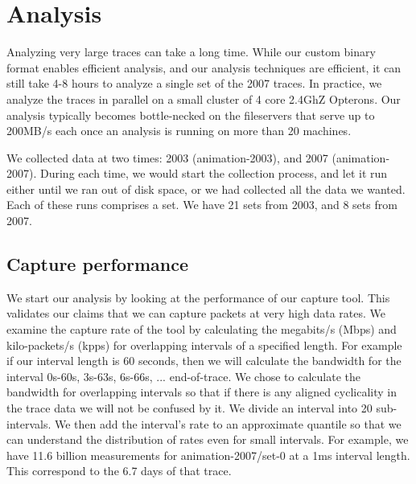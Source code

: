 \section{Analysis}
\label{sec:analysis}

Analyzing very large traces can take a long time.  While our custom
binary format enables efficient analysis, and our analysis techniques
are efficient, it can still take 4-8 hours to analyze a single set of
the 2007 traces.  In practice, we analyze the traces in parallel on a
small cluster of 4 core 2.4GhZ Opterons.  Our analysis typically
becomes bottle-necked on the fileservers that serve up to 200MB/s each
once an analysis is running on more than 20 machines.

We collected data at two times: 2003 (animation-2003), and 2007
(animation-2007).  During each time, we would start the collection
process, and let it run either until we ran out of disk space, or we
had collected all the data we wanted.  Each of these runs comprises a
set.  We have 21 sets from 2003, and 8 sets from 2007.

\subsection{Capture performance}

We start our analysis by looking at the performance of our capture
tool.  This validates our claims that we can capture packets at very
high data rates.  We examine the capture rate of the tool by
calculating the megabits/s (Mbps) and kilo-packets/s (kpps) for
overlapping intervals of a specified length.  For example if our
interval length is 60 seconds, then we will calculate the bandwidth
for the interval 0s-60s, 3s-63s, 6s-66s, ... end-of-trace.  We chose
to calculate the bandwidth for overlapping intervals so that if there
is any aligned cyclicality in the trace data we will not be confused
by it.  We divide an interval into 20 sub-intervals.  We then add the
interval's rate to an approximate quantile so that we can understand
the distribution of rates even for small intervals.  For example, we
have 11.6 billion measurements for animation-2007/set-0 at a 1ms interval
length.  This correspond to the 6.7 days of that trace.

